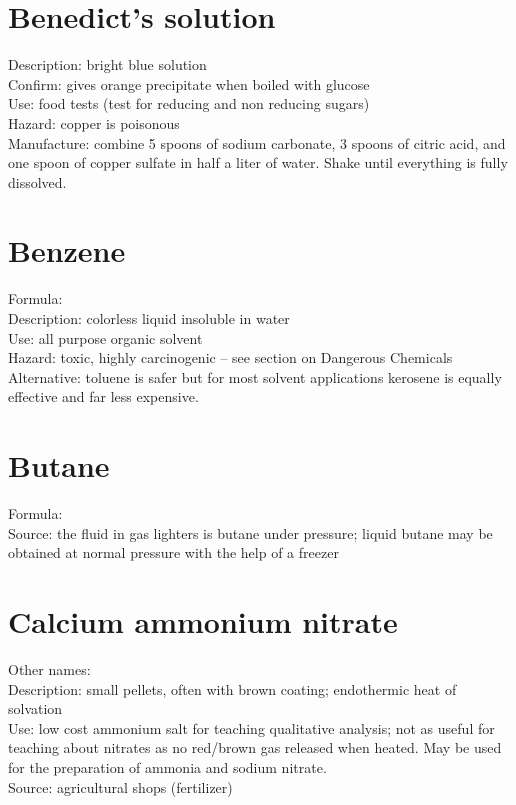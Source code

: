 \section{Benedict's solution}
\label{sec:benedict}
Description: bright blue solution\\
Confirm: gives orange precipitate when boiled with glucose\\
Use: food tests (test for reducing and non reducing sugars)\\
Hazard: copper is poisonous\\
Manufacture: combine 5 spoons of sodium carbonate, 
3 spoons of citric acid, 
and one spoon of copper sulfate in half a liter of water. 
Shake until everything is fully dissolved.

\section{Benzene}
Formula: \\
Description: colorless liquid insoluble in water\\
Use: all purpose organic solvent\\
Hazard: toxic, 
highly carcinogenic – see section on Dangerous Chemicals\\
Alternative: toluene is safer but for most solvent applications 
kerosene is equally effective and far less expensive.

\section{Butane}
Formula: \\
Source: the fluid in gas lighters is butane under pressure; 
liquid butane may be obtained at normal pressure with the help of a freezer

\section{Calcium ammonium nitrate}
Other names: \\
Description: small pellets, 
often with brown coating; 
endothermic heat of solvation\\
Use: low cost ammonium salt for teaching qualitative analysis; 
not as useful for teaching about nitrates 
as no red/brown gas released when heated. 
May be used for the preparation of ammonia and sodium nitrate.\\
Source: agricultural shops (fertilizer)\\

